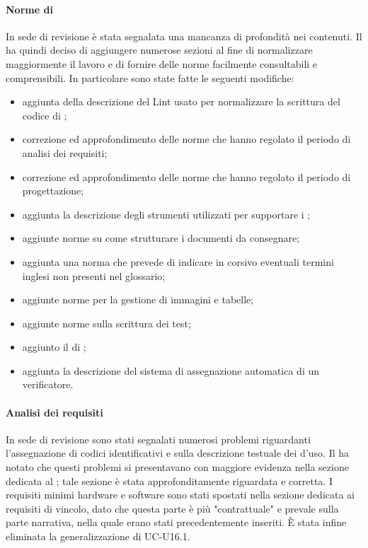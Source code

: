 \paragraph*{Norme di }
In sede di revisione è stata segnalata una mancanza di profondità nei contenuti. Il  ha quindi deciso di aggiungere numerose sezioni al fine di normalizzare maggiormente il lavoro e di fornire delle norme facilmente consultabili e comprensibili. In particolare sono state fatte le seguenti modifiche:
\begin{itemize}
\item aggiunta della descrizione del Lint usato per normalizzare la scrittura del codice di ;
\item correzione ed approfondimento delle norme che hanno regolato il periodo di analisi dei requisiti;
\item correzione ed approfondimento delle norme che hanno regolato il periodo di progettazione;
\item aggiunta la descrizione degli strumenti utilizzati per supportare i ;
\item aggiunte norme su come strutturare i documenti da consegnare;
\item aggiunta una norma che prevede di indicare in corsivo eventuali termini inglesi non presenti nel glossario;
\item aggiunte norme per la gestione di immagini e tabelle;
\item aggiunte norme sulla scrittura dei test;
\item aggiunto il  di ;
\item aggiunta la descrizione del sistema di assegnazione automatica di un verificatore.
\end{itemize}

\paragraph*{Analisi dei requisiti}
In sede di revisione sono stati segnalati numerosi problemi riguardanti l'assegnazione di codici identificativi e sulla descrizione testuale dei  d'uso. Il  ha notato che questi problemi si presentavano con maggiore evidenza nella sezione dedicata al ; tale sezione è stata approfonditamente riguardata e corretta. I requisiti minimi hardware e software sono stati spostati nella sezione dedicata ai requisiti di vincolo, dato che questa parte è più "contrattuale" e prevale sulla parte narrativa, nella quale erano stati precedentemente inseriti. È stata infine eliminata la generalizzazione di UC-U16.1.

